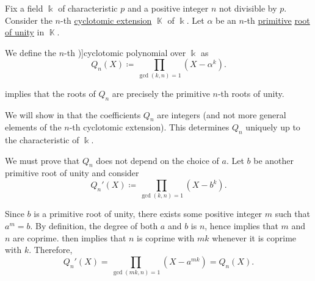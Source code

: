 \begin{definition}\label{def:cyclotomic_polynomial}
  Fix a field \( \Bbbk \) of characteristic \( p \) and a positive integer \( n \) not divisible by \( p \). Consider the \( n \)-th \hyperref[def:cyclotomic_extension]{cyclotomic extension} \( \BbbK \) of \( \Bbbk \). Let \( \alpha \) be an \( n \)-th \hyperref[def:primitive_root_of_unity]{primitive} \hyperref[def:root_of_unity]{root of unity} in \( \BbbK \).

  We define the \( n \)-th \term[ru=круговой / циклотомический (многочлен) (\cite[130]{Тыртышников2017ОсновыАлгебры})]{cyclotomic polynomial} over \( \Bbbk \) as
  \begin{equation}\label{eq:def:cyclotomic_polynomial}
    Q_n(X) \coloneqq \prod_{\gcd(k, n) = 1} (X - \alpha^k).
  \end{equation}
\end{definition}
\begin{comments}
  \item {} implies that the roots of \( Q_n \) are precisely the primitive \( n \)-th roots of unity.
  \item We will show in  that the coefficients \( Q_n \) are integers (and not more general elements of the \( n \)-th cyclotomic extension). This determines \( Q_n \) uniquely up to the characteristic of \( \Bbbk \).
\end{comments}
\begin{defproof}
  We must prove that \( Q_n \) does not depend on the choice of \( a \). Let \( b \) be another primitive root of unity and consider
  \begin{equation*}
    Q_n'(X) \coloneqq \prod_{\gcd(k, n) = 1} (X - b^k).
  \end{equation*}

  Since \( b \) is a primitive root of unity, there exists some positive integer \( m \) such that \( a^m = b \). By definition, the degree of both \( a \) and \( b \) is \( n \), hence  implies that \( m \) and \( n \) are coprime.  then implies that \( n \) is coprime with \( mk \) whenever it is coprime with \( k \). Therefore,
  \begin{equation*}
    Q_n'(X) = \prod_{\gcd(mk, n) = 1} (X - a^{mk}) = Q_n(X).
  \end{equation*}
\end{defproof}

